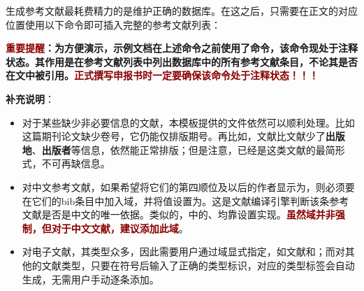 \documentclass[QingNianC, vlined, timesmathnogreek]{nsfc}
\begin{document}
	生成参考文献最耗费精力的是维护正确的数据库。在这之后，只需要在正文的对应位置使用以下命令即可插入完整的参考文献列表：

	
	\textbf{\textcolor{DarkRed}{重要提醒}：为方便演示，示例文档在上述命令之前使用了命令，该命令现处于注释状态。其作用是在参考文献列表中列出数据库中的所有参考文献条目，不论其是否在文中被引用。\textcolor{DarkRed}{正式撰写申报书时一定要确保该命令处于注释状态！！！}}
	
	\textbf{补充说明}：
	\begin{itemize}
		\item 对于某些缺少非必要信息的文献，本模板提供的文件依然可以顺利处理。比如\cite{王晓琰2019关于连续出版会议论文著录格式的探讨}这篇期刊论文缺少卷号，它仍能仅排版期号。再比如，文献\cite{电子文献2}比文献\cite{电子文献1}少了\textbf{出版地}、\textbf{出版者}等信息，依然能正常排版；但是注意，\cite{电子文献2}已经是这类文献的最简形式，不可再缺信息。
		
		\item 对中文参考文献，如果希望将它们的第四顺位及以后的作者显示为，则必须要在它们的bib条目中加入域，并将值设置为。这是文献编译引擎判断该条参考文献是否是中文的唯一依据。类似的，\cite{罗杰斯2011}中的、均靠设置实现。\textbf{\textcolor{DarkRed}{虽然域并非强制，但对于中文文献，建议添加此域}}。
		
		\item 对电子文献，其类型众多，因此需要用户通过域显式指定，如文献\cite{电子文献1}和\cite{电子文献2}；而对其他的文献类型，只要在符号后输入了正确的类型标识，对应的类型标签会自动生成，无需用户手动逐条添加。
	\end{itemize}
	
	
	
\end{document}
